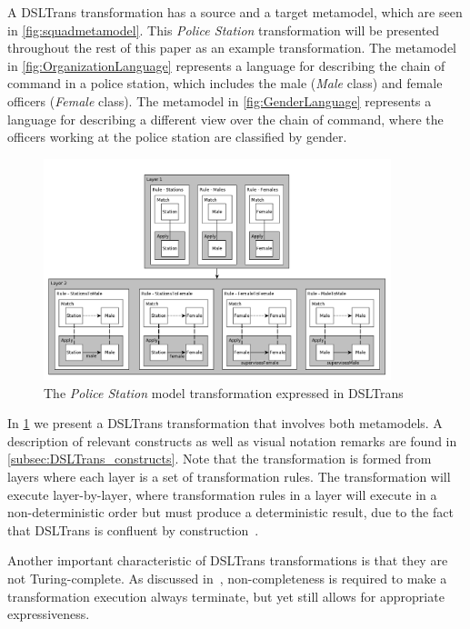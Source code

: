 A DSLTrans transformation has a source and a target metamodel, which are seen
in \cref{fig:squadmetamodel}. This \emph{Police Station}
transformation will be presented throughout
the rest of this paper as an example transformation. The metamodel
in \cref{fig:OrganizationLanguage} represents a language for describing
the chain of command in a police station, which includes the male (\emph{Male}
class) and female officers (\emph{Female} class). The metamodel in
\cref{fig:GenderLanguage} represents a language for describing a different
view over the chain of command, where the officers working at the police station
are classified by gender.

\begin{figure}[bht]
	\centering
		\includegraphics[width=0.9\textwidth]{./figures/policestation_dsltrans/transformation.pdf}
	\caption{The \emph{Police Station} model transformation expressed in DSLTrans}
	\label{fig:dsltransformation}
\end{figure}

In \cref{fig:dsltransformation} we present a DSLTrans transformation that involves both metamodels.  A description of relevant constructs as well as visual notation remarks are found in \cref{subsec:DSLTrans_constructs}. Note
that the transformation is formed
from layers where each layer is a set of transformation rules. The
transformation will execute layer-by-layer, where transformation rules in a layer will execute in a
non-deterministic order but must produce a deterministic result, due to the fact that DSLTrans is confluent by construction~\cite{DBLP:conf/sle/BarrocaLAFS10}.

Another important characteristic of DSLTrans transformations is that they are not Turing-complete. As discussed in~\cite{DBLP:conf/sle/BarrocaLAFS10}, non-completeness is required to make a transformation execution always terminate, but yet still allows for appropriate expressiveness.

